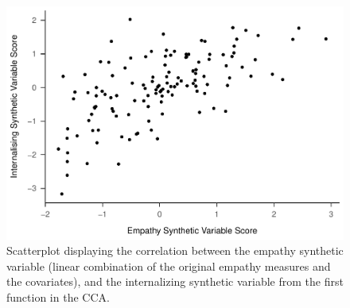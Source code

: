 \documentclass[
  english,
  man,floatsintext]{apa6}
\begin{document}
\begin{figure}
\centering
\includegraphics{papaja_cca_files/figure-latex/scatterplot-1.pdf}
\caption{\label{fig:scatterplot}Scatterplot displaying the correlation between the empathy synthetic variable
(linear combination of the original empathy measures and the covariates), and the internalizing
synthetic variable from the first function in the CCA.}
\end{figure}
\end{document}
